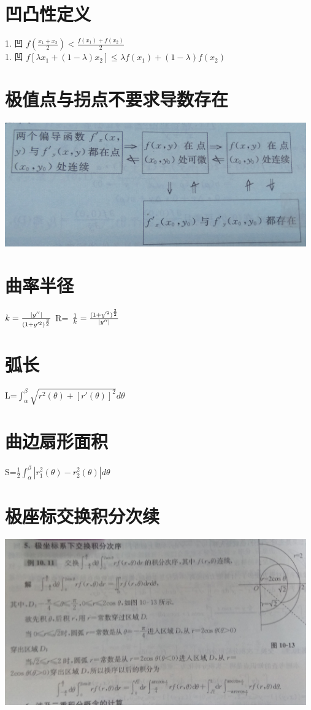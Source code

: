 \documentclass[UTF8]{ctexart}
\begin{document}
\section{凹凸性定义}
    1. 凹  $ f(\frac{x_1+x_2}{2}) < \frac{f(x_1)+f(x_2)}{2}$   \\
    1. 凹  $ f[λx_1 +(1-λ)x_2] \leq λf(x_1)+(1-λ)f(x_2)$  \\

\section{极值点与拐点不要求导数存在}
\includegraphics[width=13cm]{9345E7/2367085874.jpg}

\section{曲率半径}
$ k= \frac{|y''|}{{(1+y'^2)}^{3 \over 2}}$
R= $ \frac{1}{k}=\frac{{(1+y'^2)}^{3 \over 2}}{|y''|}$

\section{弧长}
L=$ \int_α^β \sqrt{r^2(θ)+[r'(θ)]^2}dθ$
\section{曲边扇形面积}
 S=$ \frac{1}{2} \int_α^β|r_1^2(θ)-r_2^2(θ)|dθ$

\section{极座标交换积分次续}
\includegraphics[width=13cm]{9345E7/3720754172.jpg}
\end{document}
